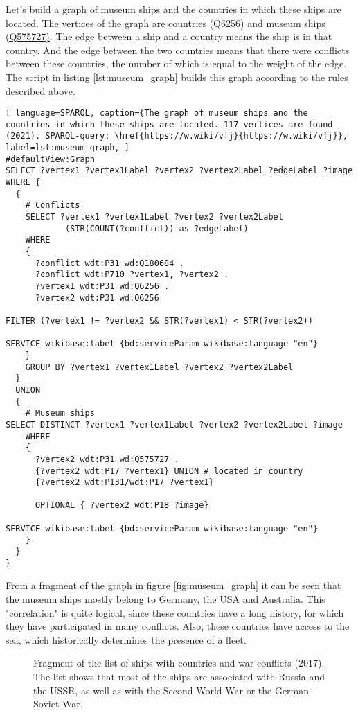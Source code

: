 Let's build a graph of museum ships and the countries in which these ships are located. The vertices of the graph are \href{https://www.wikidata.org/wiki/Q6256}{countries (Q6256)} and \href{https://www.wikidata.org/wiki/Q575727}{museum ships (Q575727)}. The edge between a ship and a country means the ship is in that country. And the edge between the two countries means that there were conflicts between these countries, the number of which is equal to the weight of the edge. The script in listing \ref{lst:museum_graph} builds this graph according to the rules described above.

\begin{lstlisting}[ language=SPARQL, caption={The graph of museum ships and the countries in which these ships are located. 117 vertices are found (2021). SPARQL-query: \href{https://w.wiki/vfj}{https://w.wiki/vfj}}, label=lst:museum_graph, ]
#defaultView:Graph    
SELECT ?vertex1 ?vertex1Label ?vertex2 ?vertex2Label ?edgeLabel ?image 
WHERE {
  {
    # Conflicts
    SELECT ?vertex1 ?vertex1Label ?vertex2 ?vertex2Label 
            (STR(COUNT(?conflict)) as ?edgeLabel) 
    WHERE
    {
      ?conflict wdt:P31 wd:Q180684 .
      ?conflict wdt:P710 ?vertex1, ?vertex2 .
      ?vertex1 wdt:P31 wd:Q6256 . 
      ?vertex2 wdt:P31 wd:Q6256
  
FILTER (?vertex1 != ?vertex2 && STR(?vertex1) < STR(?vertex2))
    
SERVICE wikibase:label {bd:serviceParam wikibase:language "en"}
    }
    GROUP BY ?vertex1 ?vertex1Label ?vertex2 ?vertex2Label
  }
  UNION
  {
    # Museum ships
SELECT DISTINCT ?vertex1 ?vertex1Label ?vertex2 ?vertex2Label ?image
    WHERE
    {
      ?vertex2 wdt:P31 wd:Q575727 .
      {?vertex2 wdt:P17 ?vertex1} UNION # located in country
      {?vertex2 wdt:P131/wdt:P17 ?vertex1}
          
      OPTIONAL { ?vertex2 wdt:P18 ?image}
          
SERVICE wikibase:label {bd:serviceParam wikibase:language "en"}
    }
  }
}
\end{lstlisting}

From a fragment of the graph in figure \ref{fig:museum_graph} it can be seen that the museum ships mostly belong to Germany, the USA and Australia. This "correlation" is quite logical, since these countries have a long history, for which they have participated in many conflicts. Also, these countries have access to the sea, which historically determines the presence of a fleet.

\begin{figure*}[ht]
  {
  \setlength{\fboxsep}{0pt}%
  \setlength{\fboxrule}{1pt}%
  }
    \caption[List of ships with countries and war conflicts]{Fragment of the list of ships with countries and war conflicts (2017). The list shows that most of the ships are associated with Russia and the USSR, as well as with the Second World War or the German-Soviet War.}%
    \label{fig:ships_by_country_and_conflict}%
\end{figure*}